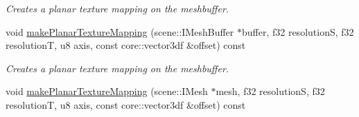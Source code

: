 \begin{DoxyCompactItemize}
\begin{DoxyCompactList}\small\item\em Creates a planar texture mapping on the meshbuffer. \end{DoxyCompactList}\item 
\hypertarget{classirr_1_1scene_1_1_c_mesh_manipulator_a5fab1227c517cb05c0a7c8c92d1e4922}{void \hyperlink{classirr_1_1scene_1_1_c_mesh_manipulator_a5fab1227c517cb05c0a7c8c92d1e4922}{make\-Planar\-Texture\-Mapping} (scene\-::\-I\-Mesh\-Buffer $\ast$buffer, f32 resolution\-S, f32 resolution\-T, u8 axis, const core\-::vector3df \&offset) const }\label{classirr_1_1scene_1_1_c_mesh_manipulator_a5fab1227c517cb05c0a7c8c92d1e4922}

\begin{DoxyCompactList}\small\item\em Creates a planar texture mapping on the meshbuffer. \end{DoxyCompactList}\item 
\hypertarget{classirr_1_1scene_1_1_c_mesh_manipulator_a120ba00acecca9c348d356dd1e429118}{void \hyperlink{classirr_1_1scene_1_1_c_mesh_manipulator_a120ba00acecca9c348d356dd1e429118}{make\-Planar\-Texture\-Mapping} (scene\-::\-I\-Mesh $\ast$mesh, f32 resolution\-S, f32 resolution\-T, u8 axis, const core\-::vector3df \&offset) const }\label{classirr_1_1scene_1_1_c_mesh_manipulator_a120ba00acecca9c348d356dd1e429118}


\end{DoxyCompactItemize}
